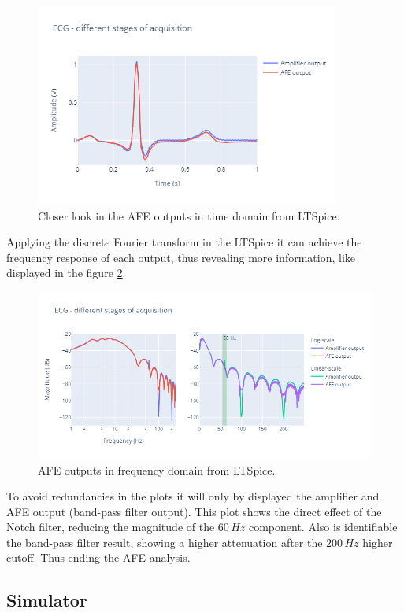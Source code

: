 \begin{figure}[h!] 
    \centering
    \includegraphics[width=10cm]{images/AFE/afe2.png}
    \caption{Closer look in the AFE outputs in time domain from LTSpice.}
    \label{fig:afe:2}
\end{figure}

Applying the discrete Fourier transform in the LTSpice it can achieve the frequency response of each output, thus revealing more information, like displayed in the figure \ref{fig:afe:4}. 

\begin{figure}[h!] 
    \centering
    \includegraphics[width=\textwidth]{images/AFE/afe4.png}
    \caption{AFE outputs in frequency domain from LTSpice.}
    \label{fig:afe:4}
\end{figure}

To avoid redundancies in the plots it will only by displayed the amplifier and AFE output (band-pass filter output). This plot shows the direct effect of the Notch filter, reducing the magnitude of the $60 \, Hz$ component. Also is identifiable the band-pass filter result, showing a higher attenuation after the $200 \, Hz$ higher cutoff. Thus ending the AFE analysis.

\subsection{Simulator}


